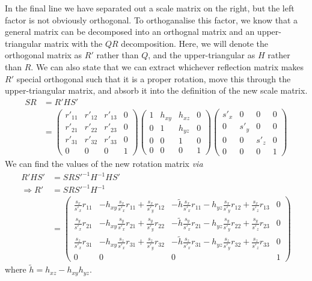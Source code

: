 \documentclass{article}
\begin{document}
In the final line we have separated out a scale matrix on the right, but the left factor is not obviously orthogonal. To orthoganalise this factor, we know that a general matrix can be decomposed into an orthognal matrix and an upper-triangular matrix with the $QR$ decomposition. Here, we will denote the orthogonal matrix as $R'$ rather than $Q$, and the upper-triangular as $H$ rather than $R$. We can also state that we can extract whichever reflection matrix makes $R'$ special orthogonal such that it is a proper rotation, move this through the upper-triangular matrix, and absorb it into the definition of the new scale matrix.
\begin{align}
S R &= R' H S'\\
&= \begin{pmatrix}
r'_{11} & r'_{12} & r'_{13} & 0\\
r'_{21} & r'_{22} & r'_{23} & 0\\
r'_{31} & r'_{32} & r'_{33} & 0\\
0 & 0 & 0 & 1
\end{pmatrix}
\begin{pmatrix}
1 & h_{xy} & h_{xz} & 0\\
0 &      1 & h_{yz} & 0\\
0 &      0 &      1 & 0\\
0 &      0 &      0 & 1
\end{pmatrix}
\begin{pmatrix}
s'_x & 0 & 0 & 0\\
0 & s'_y & 0 & 0\\
0 & 0 & s'_z & 0\\
0 & 0 & 0 & 1
\end{pmatrix}
\end{align}
We can find the values of the new rotation matrix \textit{via}
\begin{align}
R'HS' &= SRS'^{-1} H^{-1} H S'\\
\Rightarrow R' &= S R S'^{-1} H^{-1}\\
&= \begin{pmatrix}
\frac{s_x}{s'_x} r_{11} & - h_{xy} \frac{s_x}{s'_x} r_{11} + \frac{s_x}{s'_y} r_{12} & - \widetilde{h} \frac{s_x}{s'_x} r_{11} - h_{yz} \frac{s_x}{s'_y} r_{12} + \frac{s_x}{s'_z} r_{13} & 0\\
\frac{s_y}{s'_x} r_{21} & -h_{xy} \frac{s_y}{s'_x} r_{21} + \frac{s_y}{s'_y} r_{22} &  - \widetilde{h} \frac{s_y}{s'_x} r_{21} - h_{yz} \frac{s_y}{s'_y} r_{22} + \frac{s_y}{s'_z} r_{23} & 0\\
\frac{s_z}{s'_x} r_{31} & -h_{xy} \frac{s_z}{s'_x} r_{31} + \frac{s_z}{s'_y} r_{32} &  - \widetilde{h} \frac{s_z}{s'_x} r_{31} - h_{yz} \frac{s_z}{s'_y} r_{32}  + \frac{s_z}{s'_z} r_{33} & 0\\
0 & 0 & 0 & 1
\end{pmatrix}
\end{align}
where $\widetilde{h} = h_{xz} - h_{xy}h_{yz}$.
\end{document}
